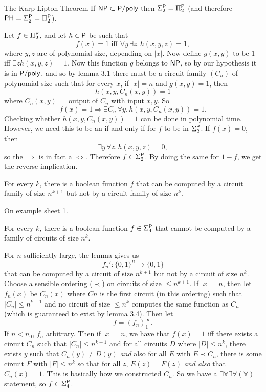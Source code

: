 \documentclass{article}
\begin{document}
\endproof
\begin{fancythm}{The Karp-Lipton Theorem}
    If $\mathsf{NP} \subset \mathsf{P/poly}$ then $\Sigma_{2}^{\mathsf{P}} = \Pi_{2}^{\mathsf{P}}$ (and therefore $\mathsf{PH} = \Sigma_{2}^{\mathsf{P}} = \Pi_{2}^{\mathsf{P}}$).
\end{fancythm}
\newlec \proof Let $f \in \Pi_{2}^{\mathsf{P}}$, and let $h \in \mathsf{P}$ be such that \[f(x)=1 \text{ iff }\forall y \, \exists z. \, h(x,y,z)=1,\]
where $y,z$ are of  polynomial size, depending on $|x|$. Now define $g(x,y)$ to be $1$ iff $\exists z h(x,y,z)=1$. Now this function $g$ belongs to $\mathsf{NP}$, so by our hypothesis it is in $\mathsf{P/poly}$, and so by lemma 3.1 there must be a circuit family $(C_{n})$ of polynomial size such that for every $x$, if $|x|=n$ and $g(x,y)=1$, then \[ h(x,y,C_{n}(x,y))=1 \] where $C_{n}(x,y) = $ output of $C_{n}$ with input $x,y$. So \[ f(x) =1 \Rightarrow \exists C_{n} \, \forall y. \, h(x,y,C_{n}(x,y))=1.\] Checking whether $h(x,y,C_{n}(x,y))=1$ can be done in polynomial time. However, we need this to be an if and only if for $f$ to be in $\Sigma_{2}^{\mathsf{P}}$. If $f(x)=0$, then \[ \exists y \, \forall z. \, h(x,y,z)=0,\] so the $\Rightarrow$ is in fact a $\Leftrightarrow$. Therefore $f \in \Sigma_{2}^{\mathsf{P}}$. By doing the same for $1-f$, we get the reverse implication. \endproof
\begin{fancylem}{}
    For every $k$, there is a boolean function $f$ that can be computed by a circuit family of size $n^{k+1}$ but not by a circuit family of size $n^{k}$.
\end{fancylem}
\proof On example sheet 1. \endproof 
\begin{fancythm}{}
   For every $k$, there is a boolean function $f \in \Sigma_{4}^{\mathsf{P}}$ that cannot be computed by a family of circuits of size $n^{k}$.
\end{fancythm}
\proof For $n$ sufficiently large, the lemma gives us \[ f_{n}' : \{0,1\}^{n} \to \{0,1\}\] that can be computed by a circuit of size $n^{k+1}$ but not by a circuit of size $n^{k}$. Choose a sensible ordering ($\prec$) on circuits of size $\leq n^{k+1}$. If $|x|=n$, then let $f_{n}(x)$ be $C_{n}(x)$ where $C{n}$ is the first circuit (in this ordering) such that $|C_{n}| \leq n^{k+1}$ and no circuit of size $\leq n^{k}$ computes the same function as $C_{n}$ (which is guaranteed to exist by lemma 3.4). Then let \[ f = (f_{n})^{\infty}_{1}.\] If $n < n_{0}$, $f_{n}$ arbitrary. \gap 
Then if $|x|=n$, we have that $f(x)=1$ iff there exists a circuit $C_{n}$ such that $|C_{n}|\leq n^{k+1}$ and for all circuits $D$ where $|D|\leq n^{k}$, there exists $y$ such that $C_{n}(y) \neq D(y)$ \textit{and} also for all $E$ with $E \prec C_{n}$, there is some circuit $F$ with $|F| \leq n^{k}$ so that for all $z$, $E(z)=F(z)$ \textit{and also} that $C_{n}(x)=1$. This is basically how we constructed $C_{n}$. So we have a $\exists \forall \exists \forall (\forall)$ statement, so $f \in \Sigma_{4}^{\mathsf{P}}$. \endproof 
\end{document}
